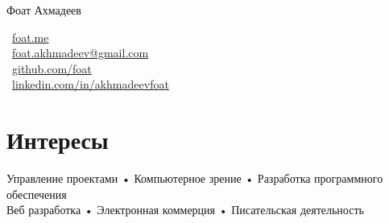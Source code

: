 \documentclass[10pt, a4paper]{article}
\makeatletter
\def\myauthor{Фоат Ахмадеев}
\def\myemail{foat.akhmadeev@gmail.com}
\def\mygithub{github.com/foat}
\def\mylinkedin{linkedin.com/in/akhmadeevfoat}
\def\myhomesite{foat.me}
\makeatother
\begin{document}
{\LARGE \myauthor}\\[1cm]
\begin{minipage}[t]{2in}
\end{minipage}
\begin{minipage}[t]{4in}
\flushleft
\faHome \, \href{http://\myhomesite}{\myhomesite}\\
\faEnvelopeAlt \, \href{mailto:\myemail}{\myemail}\\
\faGithub \, \href{https://\mygithub}{\mygithub}\\
\faLinkedin \, \href{https://\mylinkedin}{\mylinkedin}\\
\end{minipage}

\section*{Интересы}
Управление проектами • Компьютерное зрение • Разработка программного обеспечения\\
Веб разработка • Электронная коммерция • Писательская деятельность
\end{document}
